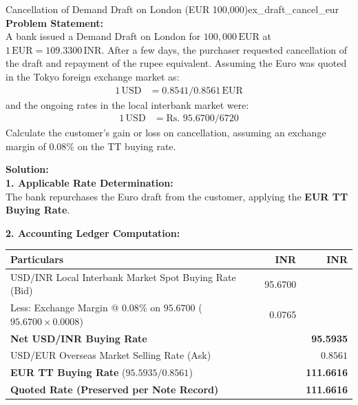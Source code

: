 \begin{example}{Cancellation of Demand Draft on London (EUR 100,000)}{ex_draft_cancel_eur}
\textbf{Problem Statement:}\\
A bank issued a Demand Draft on London for $100,000\,\text{EUR}$ at $1\,\text{EUR} = 109.3300\,\text{INR}$. After a few days, the purchaser requested cancellation of the draft and repayment of the rupee equivalent. Assuming the Euro was quoted in the Tokyo foreign exchange market as:
\begin{align*}
    1\,\text{USD} &= 0.8541 / 0.8561\,\text{EUR}
\end{align*}
and the ongoing rates in the local interbank market were:
\begin{align*}
    1\,\text{USD} &= \text{Rs. } 95.6700 / 6720
\end{align*}
Calculate the customer's gain or loss on cancellation, assuming an exchange margin of $0.08\%$ on the TT buying rate.

\tcblower
\textbf{Solution:}\\
\noindent\textbf{1. Applicable Rate Determination:}\\
The bank repurchases the Euro draft from the customer, applying the \textbf{EUR TT Buying Rate}.

\noindent\textbf{2. Accounting Ledger Computation:}
\begin{center}
\small
\begin{tabularx}{\linewidth}{Xrr}
\toprule
\textbf{Particulars} & \textbf{INR} & \textbf{INR} \\
\midrule
USD/INR Local Interbank Market Spot Buying Rate (Bid) & 95.6700 & \\
Less: Exchange Margin @ $0.08\%$ on $95.6700$ ($95.6700 \times 0.0008$) & 0.0765 & \\
\midrule
\textbf{Net USD/INR Buying Rate} & & \textbf{95.5935} \\
\midrule
USD/EUR Overseas Market Selling Rate (Ask) & & $0.8561$ \\
\midrule
\textbf{EUR TT Buying Rate} ($95.5935 / 0.8561$) & & \textbf{111.6616} \\
\textbf{Quoted Rate (Preserved per Note Record)} & & \textbf{111.6616} \\
\bottomrule
\end{tabularx}
\end{center}


\end{example}
